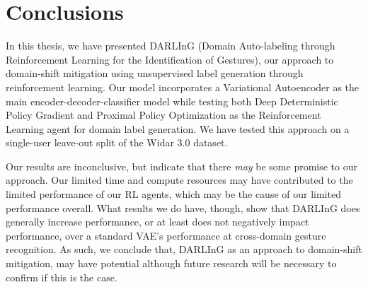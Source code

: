 \chapter{Conclusions}\label{chapter:conclusions}

In this thesis, we have presented DARLInG (Domain Auto-labeling through Reinforcement Learning for the Identification of Gestures), our approach to domain-shift mitigation using unsupervised label generation through reinforcement learning.
Our model incorporates a Variational Autoencoder as the main encoder-decoder-classifier model while testing both Deep Deterministic Policy Gradient and Proximal Policy Optimization as the Reinforcement Learning agent for domain label generation.
We have tested this approach on a single-user leave-out split of the Widar 3.0 \cite{zheng2019zero} dataset.

Our results are inconclusive, but indicate that there \textit{may} be some promise to our approach.
Our limited time and compute resources may have contributed to the limited performance of our RL agents, which may be the cause of our limited performance overall.
What results we do have, though, show that DARLInG does generally increase performance, or at least does not negatively impact performance, over a standard VAE's performance at cross-domain gesture recognition.
As such, we conclude that, DARLInG as an approach to domain-shift mitigation, may have potential although future research will be necessary to confirm if this is the case.